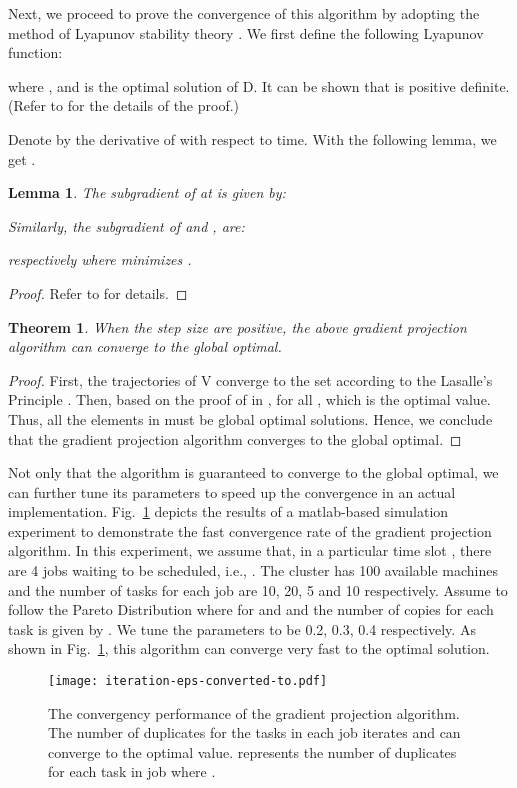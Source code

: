 \documentclass[10pt,conference]{IEEEtran}
\newtheorem{Theorem}{Theorem}
\newtheorem{lemma}{Lemma}
\begin{document}
Next, we proceed to prove the convergence of this algorithm by adopting the method of Lyapunov stability theory {\cite{Control}}. We first define the following Lyapunov function:
\begin{small}

\end{small}
where ,   and  is the optimal solution of D. It can be shown that  is positive definite. (Refer to \cite{speculative-multi-job} for the details of the proof.)

Denote by  the derivative of  with respect to time. With the following lemma, we get .
\begin{lemma}
The subgradient of  at  is given by:

Similarly, the subgradient of  and ,  are:

respectively where  minimizes .
\end{lemma}

\begin{proof}
Refer to \cite{speculative-multi-job} for details.
\end{proof}

\begin{Theorem}
\label{Theorem 1}
When the step size  are positive, the above gradient projection algorithm can converge to the global optimal.
\end{Theorem}

\begin{proof}
First, the trajectories of V converge to the set  according to the Lasalle's Principle {\cite{Control}}.  Then, based on the proof of  in \cite{speculative-multi-job}, for all ,  which is the optimal value. Thus, all the elements in  must be global optimal solutions. Hence, we conclude that the gradient projection algorithm converges to the global optimal.
\end{proof}
Not only that the algorithm is guaranteed to converge to the global optimal, we can further tune its parameters to speed up the convergence in an actual implementation.
Fig.~\ref{converge} depicts the results of a matlab-based simulation experiment to demonstrate the fast convergence rate of the gradient projection algorithm.  In this experiment, we assume that, in a particular time slot , there are 4 jobs waiting to be scheduled, i.e., .  The cluster has 100 available machines and the number of tasks for each job are 10, 20, 5 and 10 respectively. Assume  to follow the Pareto Distribution where  for  and  and the number of copies for each task is given by . We tune the parameters  to be 0.2, 0.3, 0.4 respectively. As shown in Fig.~\ref{converge}, this algorithm can converge very fast to the optimal solution.
\begin{figure}
\centering
\texttt{[image: iteration-eps-converted-to.pdf]}
\caption{The convergency performance of the gradient projection algorithm. The number of duplicates for the tasks in each job iterates and can converge to the optimal value.  represents the number of duplicates for each task in job  where .}
\label{converge}
\vspace{-0.2 cm}
\end{figure}
\end{document}
